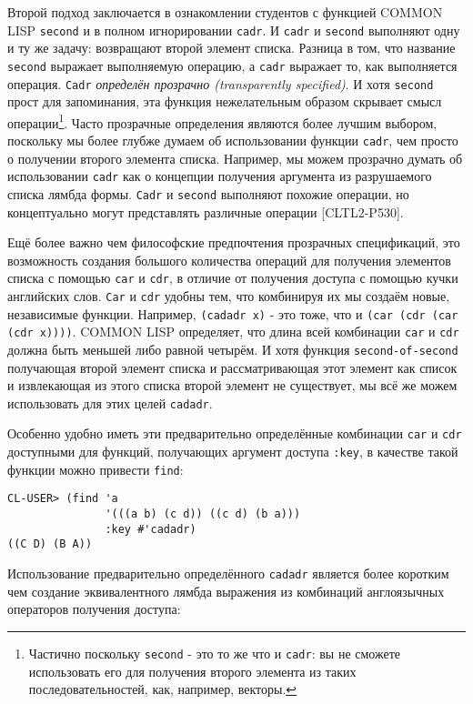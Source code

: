 Второй подход заключается в ознакомлении студентов с функцией COMMON LISP \verb"second" и в полном игнорировании \verb"cadr". И \verb"cadr" и \verb"second" выполняют одну и ту же задачу: возвращают второй элемент списка. Разница в том, что название \verb"second" выражает выполняемую операцию, а \verb"cadr" выражает то, как выполняется операция. \verb"Cadr" \emph{определён прозрачно (transparently specified)}. И хотя \verb"second" прост для запоминания, эта функция нежелательным образом скрывает смысл операции\footnote{Частично поскольку \verb"second" - это то же что и \verb"cadr": вы не сможете использовать его для получения второго элемента из таких последовательностей, как, например, векторы.}. Часто прозрачные определения являются более лучшим выбором, поскольку мы более глубже думаем об использовании функции \verb"cadr", чем просто о получении второго элемента списка. Например, мы можем прозрачно думать об использовании \verb"cadr" как о концепции получения аргумента из разрушаемого списка лямбда формы. \verb"Cadr" и \verb"second" выполняют похожие операции, но концептуально могут представлять различные операции [CLTL2-P530].



Ещё более важно чем философские предпочтения прозрачных спецификаций, это возможность создания большого количества операций для получения элементов списка с помощью \verb"car" и \verb"cdr", в отличие от получения доступа с помощью кучки английских слов. \verb"Car" и \verb"cdr" удобны тем, что комбинируя их мы создаём новые, независимые функции. Например, \verb"(cadadr x)" - это тоже, что и \verb"(car (cdr (car (cdr x))))". COMMON LISP определяет, что длина всей комбинации \verb"car" и \verb"cdr" должна быть меньшей либо равной четырём. И хотя функция \verb"second-of-second" получающая второй элемент списка и рассматривающая этот элемент как список и извлекающая из этого списка второй элемент не существует, мы всё же можем использовать для этих целей \verb"cadadr".

Особенно удобно иметь эти предварительно определённые комбинации \verb"car" и \verb"cdr" доступными для функций, получающих аргумент доступа \verb":key", в качестве такой функции можно привести \verb"find":

\begin{verbatim}
CL-USER> (find 'a
               '(((a b) (c d)) ((c d) (b a)))
               :key #'cadadr)
((C D) (B A))
\end{verbatim}

Использование предварительно определённого \verb"cadadr" является более коротким чем создание эквивалентного лямбда выражения из комбинаций англоязычных операторов получения доступа:

